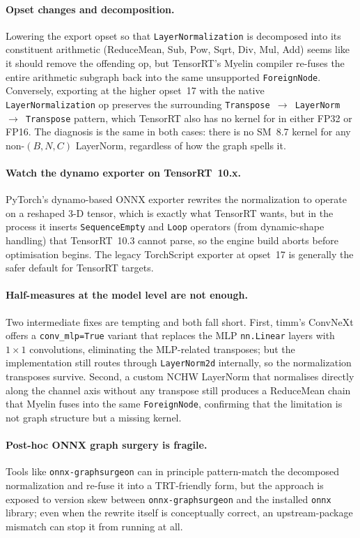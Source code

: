 \documentclass[runningheads,a4paper]{llncs}
\begin{document}
\paragraph{Opset changes and decomposition.} Lowering the export opset so that \texttt{LayerNormalization} is decomposed into its constituent arithmetic (ReduceMean, Sub, Pow, Sqrt, Div, Mul, Add) seems like it should remove the offending op, but TensorRT's Myelin compiler re-fuses the entire arithmetic subgraph back into the same unsupported \texttt{ForeignNode}. Conversely, exporting at the higher opset~17 with the native \texttt{LayerNormalization} op preserves the surrounding \texttt{Transpose $\rightarrow$ LayerNorm $\rightarrow$ Transpose} pattern, which TensorRT also has no kernel for in either FP32 or FP16. The diagnosis is the same in both cases: there is no SM~8.7 kernel for any non-$(B,N,C)$ LayerNorm, regardless of how the graph spells it.

\paragraph{Watch the dynamo exporter on TensorRT~10.x.} PyTorch's dynamo-based ONNX exporter rewrites the normalization to operate on a reshaped 3-D tensor, which is exactly what TensorRT wants, but in the process it inserts \texttt{SequenceEmpty} and \texttt{Loop} operators (from dynamic-shape handling) that TensorRT~10.3 cannot parse, so the engine build aborts before optimisation begins. The legacy TorchScript exporter at opset~17 is generally the safer default for TensorRT targets.

\paragraph{Half-measures at the model level are not enough.} Two intermediate fixes are tempting and both fall short. First, timm's ConvNeXt offers a \texttt{conv\_mlp=True} variant that replaces the MLP \texttt{nn.Linear} layers with $1\!\times\!1$ convolutions, eliminating the MLP-related transposes; but the implementation still routes through \texttt{LayerNorm2d} internally, so the normalization transposes survive. Second, a custom NCHW LayerNorm that normalises directly along the channel axis without any transpose still produces a ReduceMean chain that Myelin fuses into the same \texttt{ForeignNode}, confirming that the limitation is not graph structure but a missing kernel.

\paragraph{Post-hoc ONNX graph surgery is fragile.} Tools like \texttt{onnx-graphsurgeon} can in principle pattern-match the decomposed normalization and re-fuse it into a TRT-friendly form, but the approach is exposed to version skew between \texttt{onnx-graphsurgeon} and the installed \texttt{onnx} library; even when the rewrite itself is conceptually correct, an upstream-package mismatch can stop it from running at all.
\end{document}
